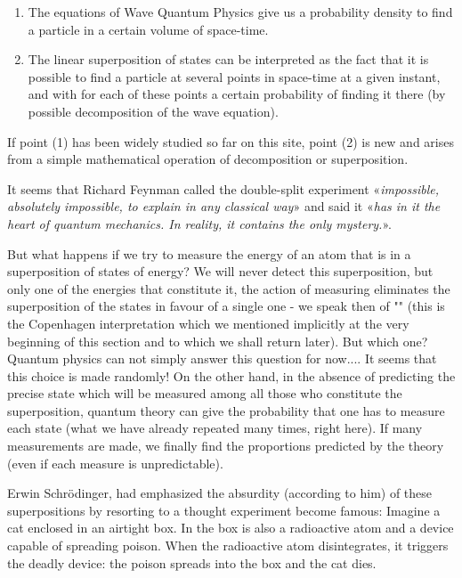 	\begin{enumerate}
		\item The equations of Wave Quantum Physics give us a probability density to find a particle in a certain volume of space-time.

		\item The linear superposition of states can be interpreted as the fact that it is possible to find a particle at several points in space-time at a given instant, and with for each of these points a certain probability of finding it there (by possible decomposition of the wave equation).
	\end{enumerate}
	If point (1) has been widely studied so far on this site, point (2) is new and arises from a simple mathematical operation of decomposition or superposition.
	
	It seems that Richard Feynman called the double-split experiment «\textit{impossible, absolutely impossible, to explain in any classical way}» and said it «\textit{has in it the heart of quantum mechanics. In reality, it contains the only mystery.}».
	
	But what happens if we try to measure the energy of an atom that is in a superposition of states of energy? We will never detect this superposition, but only one of the energies that constitute it, the action of measuring eliminates the superposition of the states in favour of a single one - we speak then of "" (this is the Copenhagen interpretation which we mentioned implicitly at the very beginning of this section and to which we shall return later). But which one? Quantum physics can not simply answer this question for now.... It seems that this choice is made randomly! On the other hand, in the absence of predicting the precise state which will be measured among all those who constitute the superposition, quantum theory can give the probability that one has to measure each state (what we have already repeated many times, right here). If many measurements are made, we finally find the proportions predicted by the theory (even if each measure is unpredictable).
	
	Erwin Schrödinger, had emphasized the absurdity (according to him) of these superpositions by resorting to a thought experiment become famous: Imagine a cat enclosed in an airtight box. In the box is also a radioactive atom and a device capable of spreading poison. When the radioactive atom disintegrates, it triggers the deadly device: the poison spreads into the box and the cat dies.
	
